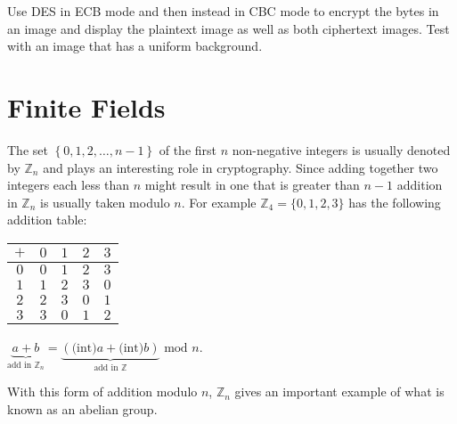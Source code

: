 \begin{exercise}
Use DES in ECB mode and then instead in CBC mode to encrypt the bytes in an image
and display the plaintext image as well as both ciphertext images.
Test with an image that has a uniform background.
\end{exercise}



\section{Finite Fields}


The set $\left\{0, 1, 2, \dots, n-1\right\}$ of the first $n$ non-negative
integers is usually denoted by $\mathbb{Z}_n$ and plays an interesting role in
cryptography. Since adding together two integers each less than $n$ might result in
one that is greater than $n-1$ addition in $\mathbb{Z}_n$ is usually taken modulo $n$.
For example $\mathbb{Z}_4 = \{0,1,2,3\}$ has the following addition table:

\begin{tabular}{|c|cccc|}\hline
  $+$ & $0$ & $1$ & $2$ & $3$ \\ \hline
  $0$ & $0$ & $1$ & $2$ & $3$ \\
  $1$ & $1$ & $2$ & $3$ & $0$ \\
  $2$ & $2$ & $3$ & $0$ & $1$ \\
  $3$ & $3$ & $0$ & $1$ & $2$ \\ \hline
\end{tabular}
\qquad\qquad
$\underbrace{a+b}_{\mbox{add in }\mathbb{Z}_n}
= \underbrace{(\mbox{(int)}a + \mbox{(int)}b)}_{\mbox{add in }\mathbb{Z}} \mbox{ mod } n$.

\noindent With this form of addition modulo $n$, $\mathbb{Z}_n$ gives an important example
of what is known as an abelian group.

